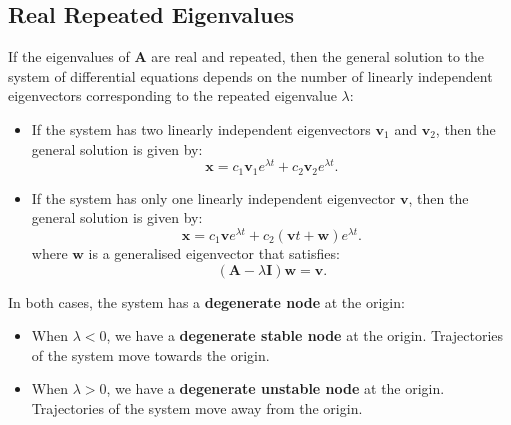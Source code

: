 \documentclass{article}
\begin{document}
\subsection{Real Repeated Eigenvalues}
If the eigenvalues of \(\symbf{A}\) are real and repeated, then the
general solution to the system of differential equations depends on the
number of linearly independent eigenvectors corresponding to the
repeated eigenvalue \(\lambda\):
\begin{itemize}
    \item If the system has two linearly independent eigenvectors
          \(\symbf{v}_1\) and \(\symbf{v}_2\), then the general
          solution is given by:
          \begin{equation*}
              \symbf{x} = c_1 \symbf{v}_1 e^{\lambda t} + c_2 \symbf{v}_2 e^{\lambda t}.
          \end{equation*}
    \item If the system has only one linearly independent eigenvector
          \(\symbf{v}\), then the general solution is given by:
          \begin{equation*}
              \symbf{x} = c_1 \symbf{v} e^{\lambda t} + c_2 \left( \symbf{v} t + \symbf{w}  \right) e^{\lambda t}.
          \end{equation*}
          where \(\symbf{w}\) is a generalised eigenvector that
          satisfies:
          \begin{equation*}
              \left( \symbf{A} - \lambda \symbf{I} \right) \symbf{w} = \symbf{v}.
          \end{equation*}
\end{itemize}
In both cases, the system has a \textbf{degenerate node} at the origin:
\begin{itemize}
    \item When \(\lambda < 0\), we have a \textbf{degenerate stable
          node} at the origin. Trajectories of the system move towards
          the origin.
    \item When \(\lambda > 0\), we have a \textbf{degenerate unstable
          node} at the origin. Trajectories of the system move away
          from the origin.
\end{itemize}
\end{document}
